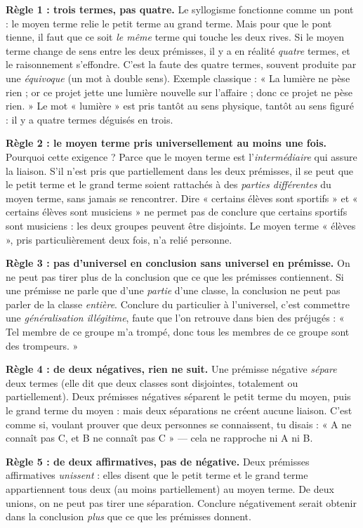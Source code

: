 \documentclass[11pt]{article}
\begin{document}
\textbf{Règle 1 : trois termes, pas quatre.} Le syllogisme fonctionne comme un pont : le moyen terme relie le petit terme au grand terme. Mais pour que le pont tienne, il faut que ce soit \emph{le même} terme qui touche les deux rives. Si le moyen terme change de sens entre les deux prémisses, il y a en réalité \emph{quatre} termes, et le raisonnement s'effondre. C'est la faute des quatre termes, souvent produite par une \emph{équivoque} (un mot à double sens). Exemple classique : « La lumière ne pèse rien ; or ce projet jette une lumière nouvelle sur l'affaire ; donc ce projet ne pèse rien. » Le mot « lumière » est pris tantôt au sens physique, tantôt au sens figuré : il y a quatre termes déguisés en trois.

\textbf{Règle 2 : le moyen terme pris universellement au moins une fois.} Pourquoi cette exigence ? Parce que le moyen terme est l'\emph{intermédiaire} qui assure la liaison. S'il n'est pris que partiellement dans les deux prémisses, il se peut que le petit terme et le grand terme soient rattachés à des \emph{parties différentes} du moyen terme, sans jamais se rencontrer. Dire « certains élèves sont sportifs » et « certains élèves sont musiciens » ne permet pas de conclure que certains sportifs sont musiciens : les deux groupes peuvent être disjoints. Le moyen terme « élèves », pris particulièrement deux fois, n'a relié personne.

\textbf{Règle 3 : pas d'universel en conclusion sans universel en prémisse.} On ne peut pas tirer plus de la conclusion que ce que les prémisses contiennent. Si une prémisse ne parle que d'une \emph{partie} d'une classe, la conclusion ne peut pas parler de la classe \emph{entière}. Conclure du particulier à l'universel, c'est commettre une \emph{généralisation illégitime}, faute que l'on retrouve dans bien des préjugés : « Tel membre de ce groupe m'a trompé, donc tous les membres de ce groupe sont des trompeurs. »

\textbf{Règle 4 : de deux négatives, rien ne suit.} Une prémisse négative \emph{sépare} deux termes (elle dit que deux classes sont disjointes, totalement ou partiellement). Deux prémisses négatives séparent le petit terme du moyen, puis le grand terme du moyen : mais deux séparations ne créent aucune liaison. C'est comme si, voulant prouver que deux personnes se connaissent, tu disais : « A ne connaît pas C, et B ne connaît pas C » — cela ne rapproche ni A ni B.

\textbf{Règle 5 : de deux affirmatives, pas de négative.} Deux prémisses affirmatives \emph{unissent} : elles disent que le petit terme et le grand terme appartiennent tous deux (au moins partiellement) au moyen terme. De deux unions, on ne peut pas tirer une séparation. Conclure négativement serait obtenir dans la conclusion \emph{plus} que ce que les prémisses donnent.
\end{document}
